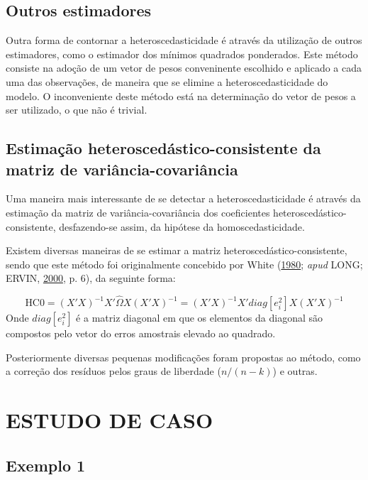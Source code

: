 \documentclass[a4paper, 12pt]{article}
\begin{document}
\hypertarget{outros-estimadores}{%
\subsection{Outros estimadores}\label{outros-estimadores}}

Outra forma de contornar a heteroscedasticidade é através da utilização
de outros estimadores, como o estimador dos mínimos quadrados
ponderados. Este método consiste na adoção de um vetor de pesos
conveninente escolhido e aplicado a cada uma das observações, de maneira
que se elimine a heteroscedasticidade do modelo. O inconveniente deste
método está na determinação do vetor de pesos a ser utilizado, o que não
é trivial.

\hypertarget{estimacao-heteroscedastico-consistente-da-matriz-de-variancia-covariancia}{%
\subsection{Estimação heteroscedástico-consistente da matriz de
variância-covariância}\label{estimacao-heteroscedastico-consistente-da-matriz-de-variancia-covariancia}}

Uma maneira mais interessante de se detectar a heteroscedasticidade é
através da estimação da matriz de variância-covariância dos coeficientes
heteroscedástico-consistente, desfazendo-se assim, da hipótese da
homoscedasticidade.

Existem diversas maneiras de se estimar a matriz
heteroscedástico-consistente, sendo que este método foi originalmente
concebido por White (\protect\hyperlink{ref-white1980}{1980};
\emph{apud} LONG; ERVIN, \protect\hyperlink{ref-Long}{2000}, p. 6), da
seguinte forma:

\[\text{HC0}=(X'X)^{-1}X' \hat{\Omega} X(X'X)^{-1} = (X'X)^{-1}X' diag[e_i^2] X(X'X)^{-1}\]
Onde \(diag[e_i^2]\) é a matriz diagonal em que os elementos da diagonal
são compostos pelo vetor do erros amostrais elevado ao quadrado.

Posteriormente diversas pequenas modificações foram propostas ao método,
como a correção dos resíduos pelos graus de liberdade (\(n/(n-k)\)) e
outras.

\hypertarget{estudo-de-caso}{%
\section{ESTUDO DE CASO}\label{estudo-de-caso}}

\hypertarget{exemplo-1}{%
\subsection{Exemplo 1}\label{exemplo-1}}
\end{document}
